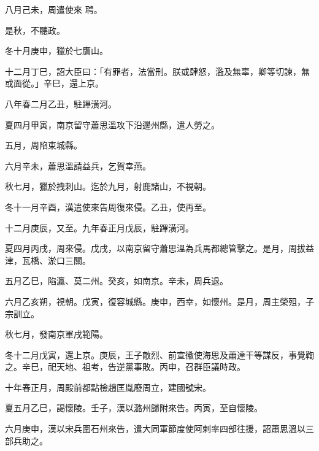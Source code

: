 \begin{pinyinscope}
 八月己未，周遣使來
 聘。



 是秋，不聽政。



 冬十月庚申，獵於七鷹山。



 十二月丁巳，詔大臣曰：「有罪者，法當刑。朕或肆怒，濫及無辜，卿等切諫，無或面從。」辛巳，還上京。



 八年春二月乙丑，駐蹕潢河。



 夏四月甲寅，南京留守蕭思溫攻下沿邊州縣，遣人勞之。



 五月，周陷束城縣。



 六月辛未，蕭思溫請益兵，乞賀幸燕。



 秋七月，獵於拽刺山。迄於九月，射鹿諸山，不視朝。



 冬十一月辛酉，漢遣使來告周復來侵。乙丑，使再至。



 十二月庚辰，又至。九年春正月戊辰，駐蹕潢河。



 夏四月丙戌，周來侵。戊戌，以南京留守蕭思溫為兵馬都總管擊之。是月，周拔益
 津，瓦橋、淤口三關。



 五月乙巳，陷瀛、莫二州。癸亥，如南京。辛未，周兵退。



 六月乙亥朔，視朝。戊寅，復容城縣。庚申，西幸，如懷州。是月，周主榮殂，子宗訓立。



 秋七月，發南京軍戌範陽。



 冬十二月戊寅，還上京。庚辰，王子敵烈、前宣徽使海思及蕭達干等謀反，事覺鞫之。辛巳，祀天地、祖考，告逆黨事敗。丙申，召群臣議時政。



 十年春正月，周殿前都點檢趙匡胤廢周立，建國號宋。



 夏五月乙巳，謁懷陵。壬子，漢以潞州歸附來告。丙寅，至自懷陵。



 六月庚申，漢以宋兵圍石州來告，遣大同軍節度使阿刺率四部往援，詔蕭思溫以三部兵助之。




\end{pinyinscope}
